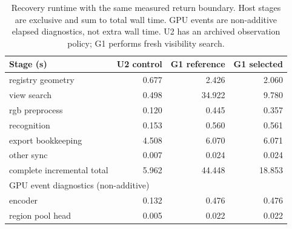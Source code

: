 \begin{table}[!ht]
\centering
\caption{Recovery runtime with the same measured return boundary. Host stages are exclusive and sum to total wall time. GPU events are non-additive elapsed diagnostics, not extra wall time. U2 has an archived observation policy; G1 performs fresh visibility search.}
\label{tab:runtime}
\fontsize{9}{11}\selectfont
\setlength{\tabcolsep}{4pt}
\begin{tabular*}{\textwidth}{@{\extracolsep{\fill}}lrrr@{}}
\toprule
Stage (s) & U2 control & G1 reference & G1 selected \\
\midrule
registry geometry & 0.677 & 2.426 & 2.060 \\
view search & 0.498 & 34.922 & 9.780 \\
rgb preprocess & 0.120 & 0.445 & 0.357 \\
recognition & 0.153 & 0.560 & 0.561 \\
export bookkeeping & 4.508 & 6.070 & 6.071 \\
other sync & 0.007 & 0.024 & 0.024 \\
complete incremental total & 5.962 & 44.448 & 18.853 \\
\multicolumn{4}{l}{GPU event diagnostics (non-additive)} \\
encoder & 0.132 & 0.476 & 0.476 \\
region pool head & 0.005 & 0.022 & 0.022 \\
\bottomrule
\end{tabular*}
\end{table}
